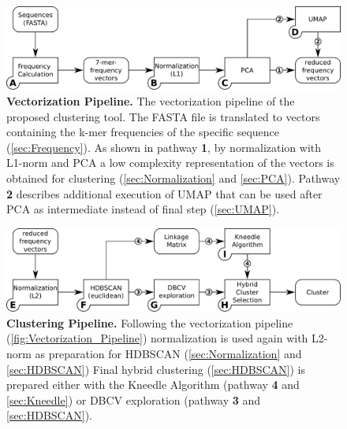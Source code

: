 \begin{figure}[!hbt]
    \centering
    \includegraphics[width=\textwidth]{Graphics/Vectorization.pdf}
    \caption[Clustering Pipeline]{\textbf{Vectorization Pipeline.} The vectorization pipeline of the proposed clustering tool. The FASTA file is translated to vectors containing the k-mer frequencies of the specific sequence (\autoref{sec:Frequency}). As shown in pathway \textsf{\textbf{1}}, by normalization with L1-norm and \gls{PCA} a low complexity representation of the vectors is obtained for clustering (\autoref{sec:Normalization} and \autoref{sec:PCA}). Pathway \textsf{\textbf{2}} describes additional execution of \gls{UMAP} that can be used after \gls{PCA} as intermediate instead of final step (\autoref{sec:UMAP}).}
    \label{fig:Vectorization_Pipeline}
\end{figure}

\begin{figure}[!hbt]
    \centering
    \includegraphics[width=\textwidth]{Graphics/Clustering.pdf}
    \caption[Clustering Pipeline]{\textbf{Clustering Pipeline.} Following the vectorization pipeline (\autoref{fig:Vectorization_Pipeline}) normalization is used again with L2-norm as preparation for \gls{HDBSCAN} (\autoref{sec:Normalization} and \autoref{sec:HDBSCAN}) Final hybrid clustering (\autoref{sec:HDBSCAN}) is prepared either with the Kneedle Algorithm (pathway \textsf{\textbf{4}} and \autoref{sec:Kneedle}) or DBCV exploration (pathway \textsf{\textbf{3}} and \autoref{sec:HDBSCAN}).}
    \label{fig:Clustering_Pipeline}
\end{figure}

